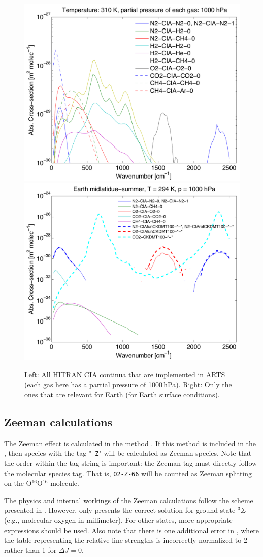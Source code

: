 \begin{figure}
 \begin{center}
  \includegraphics[width=.46\hsize]{plot_all_arts_cia_generic_1}
  \hspace{\fill}
  \includegraphics[width=.46\hsize]{plot_earth_continua_1_1}
  \caption{Left: All HITRAN CIA continua that are implemented in ARTS
    (each gas here has a partial pressure of 1000\,hPa). Right: Only
    the ones that are relevant for Earth (for Earth surface
    conditions).}
  \label{fig:absorption:cia}
 \end{center}
\end{figure}

\subsection{Zeeman calculations}
\label{sec:absorption:zeeman}

The Zeeman effect is calculated in the method .
If this method is included in the , then species with the
tag "\verb|-Z|" will be calculated as Zeeman species.
Note that the order within the tag
string is important: the Zeeman tag must directly follow the molecular species
tag. That is, \verb|O2-Z-66| will be counted as Zeeman splitting on the
O$^{16}$O$^{16}$ molecule.

The physics and internal workings of the Zeeman calculations follow the scheme
presented in \citet{larsson14:_treatment_jqsrt}.  However, \citet{larsson14:_treatment_jqsrt}
only presents the correct solution for ground-state $^3\Sigma$ (e.g., molecular oxygen in millimeter).  
For other states, more appropriate expressions should be used.  Also note that there is one
additional error in \citet{larsson14:_treatment_jqsrt}, where the table representing the relative line strengths is
incorrectly normalized to 2 rather than 1 for $\Delta J = 0$.

